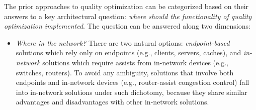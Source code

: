The prior approaches to quality optimization can be categorized
based on their answers to a key architectural question: {\em where should the
functionality of quality optimization implemented}.
The question can be answered along two dimensions:
\begin{itemize}

\item {\em Where in the network?} 
There are two natural options: 
{\em endpoint-based} solutions which rely only on endpoints (e.g., clients, 
servers, caches), and 
{\em in-network} solutions which require assists from in-network devices 
(e.g., switches, routers).
To avoid any ambiguity, solutions that involve both endpoints and in-network 
devices (e.g., router-assist congestion control) fall into in-network solutions
under such dichotomy,
because they share similar advantages and disadvantages with other 
in-network solutions.




\end{itemize}
